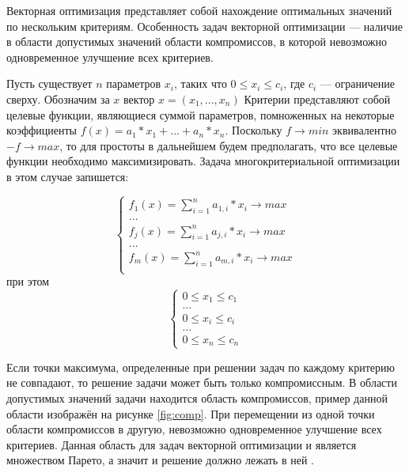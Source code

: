 \documentclass[a4paper,14pt]{report}
\begin{document}
Векторная оптимизация представляет собой нахождение оптимальных значений по нескольким критериям. Особенность задач векторной оптимизации --- наличие в области допустимых значений области компромиссов, в которой невозможно одновременное улучшение всех критериев.

Пусть существует $n$ параметров $x_i$, таких что $0 \leq x_i \leq c_i$, где $c_i$ --- ограничение сверху.
Обозначим за $x$ вектор $x = (x_1, ... , x_n)$
Критерии представляют собой целевые функции, являющиеся суммой параметров, помноженных на некоторые коэффициенты $f(x) = a_1 * x_1 + ... + a_n * x_n$. Поскольку $f \rightarrow min $ эквивалентно $-f \rightarrow max $, то для простоты в дальнейшем будем предполагать, что все целевые функции необходимо максимизировать. Задача многокритериальной оптимизации в этом случае запишется:

\begin{equation}
\begin{cases}
f_1(x) = \sum\limits_{i=1}^n a_{1,i} * x_i \rightarrow max \\
... \\
f_j(x) = \sum\limits_{i=1}^n a_{j,i} * x_i \rightarrow max \\
... \\
f_m(x) = \sum\limits_{i=1}^n a_{m,i} * x_i \rightarrow max \\
\end{cases}
\label{ref:func}
\end{equation}
при этом 
\begin{equation}
\begin{cases}
0 \leq x_1 \leq c_1 \\
... \\
0 \leq x_i \leq c_i \\
... \\
0 \leq x_n \leq c_n 
\end{cases}
\label{lim}
\end{equation}

Если точки максимума, определенные при решении задач по каждому критерию не совпадают, то решение задачи может быть только компромиссным. В области допустимых значений задачи находится область компромиссов, пример данной области изображён на рисунке \ref{fig:comp}. При перемещении из одной точки области компромиссов в другую, невозможно одновременное улучшение всех критериев. Данная область для задач векторной оптимизации и является множеством Парето, а значит и решение должно лежать в ней \cite{vectorn}.
\end{document}
